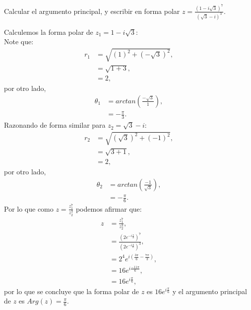 \begin{homeworkProblem}
  Calcular el argumento principal, y escribir en forma polar $z=\frac{(1-i\sqrt{3})^{7}}{(\sqrt{3}-i)^{3}}$.
  \begin{solution}
    Calculemos la forma polar de $z_1=1-i\sqrt{3}$:\\
    Note que:
    \begin{align*}
      r_1&=\sqrt{(1)^2+(-\sqrt{3})^2},\\
      &=\sqrt{1+3},\\
      &=2,
    \end{align*}
    por otro lado,
    \begin{align*}
      \theta_1&=arctan\left( \frac{-\sqrt{3}}{1} \right),\\
      &=-\frac{\pi}{3}.
    \end{align*}
    Razonando de forma similar para $z_2=\sqrt{3}-i$:
    \begin{align*}
      r_2&=\sqrt{(\sqrt{3})^2+(-1)^2},\\
      &=\sqrt{3+1},\\
      &=2,
    \end{align*}
    por otro lado,
    \begin{align*}
      \theta_2&=arctan\left( \frac{-1}{\sqrt{3}} \right),\\
      &=-\frac{\pi}{6}.
    \end{align*}
    Por lo que como $z=\frac{z_1^7}{z_2^3}$ podemos afirmar que:
    \begin{align*}
      z&=\frac{z_1^7}{z_2^3},\\
      &=\frac{(2e^{-i\frac{\pi}{3}})^{7}}{(2e^{-i\frac{\pi}{6}})^{3}},\\
      &=2^{4}e^{i\left( \frac{3\pi}{6}-\frac{7\pi}{3} \right)},\\
      &=16e^{i\frac{-11\pi}{6}},\\
      &=16e^{i\frac{\pi}{6}},
    \end{align*}
    por lo que se concluye que la forma polar de $z$ es $16e^{i\frac{\pi}{6}}$ y el argumento principal de $z$ es $Arg(z)=\frac{\pi}{6}$. 
  \end{solution}
\end{homeworkProblem}
